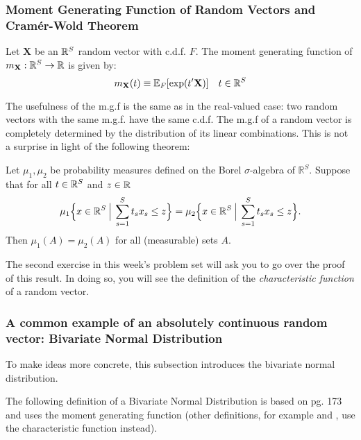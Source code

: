 \documentclass[11pt]{article} %
\begin{document}
\newpage

\subsubsection{Moment Generating Function of Random Vectors and Cram\'er-Wold Theorem}

\begin{definition}  Let $\mathbf{X}$ be an $\mathbb{R}^S$ random vector with c.d.f. $F$. The moment generating function of $m_{\mathbf{X}}: \mathbb{R}^{S} \rightarrow \mathbb{R}$ is given by:
$$m_{\mathbf{X}}(t) \equiv \mathbb{E}_{F}[\exp(t'\mathbf{X})] \quad t \in \mathbb{R}^{S}  $$
\end{definition}

The usefulness of the m.g.f is the same as in the real-valued case:  two random vectors with the same m.g.f. have the same c.d.f. The m.g.f of a random vector is completely determined by the distribution of its linear combinations. This is not a surprise in light of the following theorem:

\begin{theorem}
Let $\mu_1, \mu_2$ be probability measures defined on the Borel $\sigma$-algebra of $\mathbb{R}^S$. Suppose that for all $t \in \mathbb{R}^S$ and $z \in \mathbb{R}$
$$\mu_1 \Big\{x \in \mathbb{R}^S \: \Big | \: \sum_{s=1}^{S} t_s x_s \leq z \Big\} = \mu_2 \Big\{x \in \mathbb{R}^S \: \Big | \: \sum_{s=1}^{S} t_s x_s  \leq z \Big\}.$$
\noindent Then $\mu_1(A)=\mu_2(A)$ for all (measurable) sets $A$.
\end{theorem}

\begin{prproblem} 
The second exercise in this week's problem set will ask you to go over the proof of this result. In doing so, you will see the definition of the \emph{characteristic function} of a random vector. 
\end{prproblem}

\newpage

\subsubsection{A common example of an absolutely continuous random vector: Bivariate Normal Distribution}
To make ideas more concrete, this subsection introduces the bivariate normal distribution. 


The following definition of a Bivariate Normal Distribution is based on \cite{hogg} pg. 173 and uses the moment generating function (other definitions, for example \cite{Billingsley95} and \cite{durrett2010}, use the characteristic function instead).\\  
\end{document}
